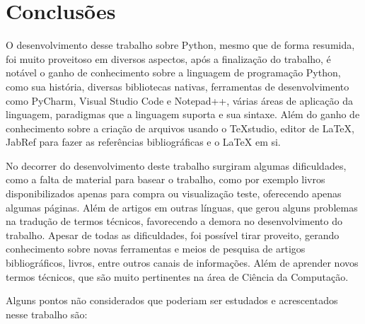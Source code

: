 

\chapter{Conclusões}

O desenvolvimento desse trabalho sobre Python, mesmo que de forma resumida, foi muito proveitoso em diversos aspectos, após a finalização do trabalho, é notável o ganho de conhecimento sobre a linguagem de programação Python, como sua história, diversas bibliotecas nativas, ferramentas de desenvolvimento como PyCharm, Visual Studio Code e Notepad++, várias áreas de aplicação da linguagem, paradigmas que a linguagem suporta e sua sintaxe. Além do ganho de conhecimento sobre a criação de arquivos usando o TeXstudio, editor de LaTeX, JabRef para fazer as referências bibliográficas e o LaTeX em si.

No decorrer do desenvolvimento deste trabalho surgiram algumas dificuldades, como a falta de material para basear o trabalho, como por exemplo livros disponibilizados apenas para compra ou visualização teste, oferecendo apenas algumas páginas. Além de artigos em outras línguas, que gerou alguns problemas na tradução de termos técnicos, favorecendo a demora no desenvolvimento do trabalho. Apesar de todas as dificuldades, foi possível tirar proveito, gerando conhecimento sobre novas ferramentas e meios de pesquisa de artigos bibliográficos, livros, entre outros canais de informações. Além de aprender novos termos técnicos, que são muito pertinentes na área de Ciência da Computação.

Alguns pontos não considerados que poderiam ser estudados e acrescentados nesse trabalho são:

